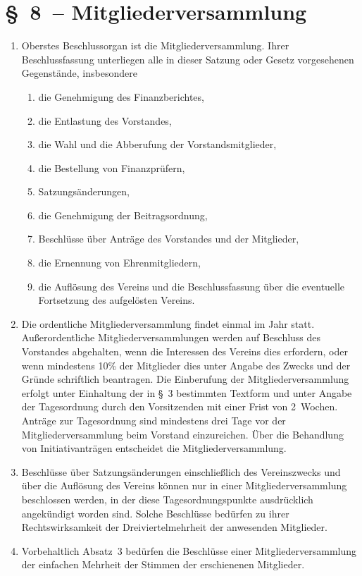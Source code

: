 \documentclass[11pt,DIV12]{scrartcl}
\begin{document}
\section*{§~8~-- Mitgliederversammlung}
\begin{enumerate}
\item Oberstes Beschlussorgan ist die Mitgliederversammlung. Ihrer Beschlussfassung unterliegen alle in dieser Satzung oder Gesetz vorgesehenen Gegenstände, insbesondere
\begin{enumerate}
    \item die Genehmigung des Finanzberichtes,
    \item die Entlastung des Vorstandes,
    \item die Wahl und die Abberufung der Vorstandsmitglieder,
    \item die Bestellung von Finanzprüfern,
    \item Satzungsänderungen,
    \item die Genehmigung der Beitragsordnung,
    \item Beschlüsse über Anträge des Vorstandes und der Mitglieder,
    \item die Ernennung von Ehrenmitgliedern,
    \item die Auflösung des Vereins und die Beschlussfassung über die eventuelle Fortsetzung des aufgelösten Vereins.
\end{enumerate}
\item Die ordentliche Mitgliederversammlung findet einmal im Jahr statt. Außerordentliche Mitgliederversammlungen werden auf Beschluss des Vorstandes abgehalten, wenn die Interessen des Vereins dies erfordern, oder wenn mindestens 10\% der Mitglieder dies unter Angabe des Zwecks und der Gründe schriftlich beantragen. Die Einberufung der Mitgliederversammlung erfolgt unter Einhaltung der in §~3 bestimmten Textform und unter Angabe der Tagesordnung durch den Vorsitzenden mit einer Frist von 2~Wochen. Anträge zur Tagesordnung sind mindestens drei Tage vor der Mitgliederversammlung beim Vorstand einzureichen. Über die Behandlung von Initiativanträgen entscheidet die Mitgliederversammlung.
\item Beschlüsse über Satzungsänderungen einschließlich des Vereinszwecks und über die Auflösung des Vereins können nur in einer Mitgliederversammlung beschlossen werden, in der diese Tagesordnungspunkte ausdrücklich angekündigt worden sind. Solche Beschlüsse bedürfen zu ihrer Rechtswirksamkeit der Dreiviertelmehrheit der anwesenden Mitglieder.
\item Vorbehaltlich Absatz~3 bedürfen die Beschlüsse einer Mitgliederversammlung der einfachen Mehrheit der Stimmen der erschienenen Mitglieder.

\end{enumerate}
\end{document}
